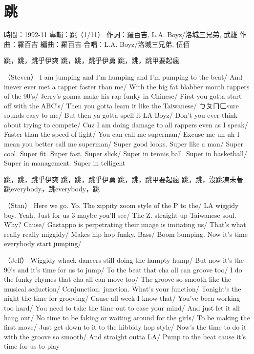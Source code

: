 \documentclass[UTF8,a4paper,oneside,twocolumn,12pt]{ctexbook}
\newcommand{\infopair}[2]{\textbullet #1：#2}
\newcommand{\zc}[1][伍佰]{\infopair{作詞}{#1}}
\newcommand{\zq}[1][伍佰]{\infopair{作曲}{#1}}
\newcommand{\bq}[1][伍佰]{\infopair{編曲}{#1}}
\newcommand{\zj}[1]{\infopair{專輯}{#1}}
\newcommand{\yc}[1]{\infopair{原唱}{#1}}
\newcommand{\sj}[1]{\infopair{時間}{#1}}
\newenvironment{info}{\begin{flushleft}\kaishu
	}
	{\end{flushleft}\normalsize\yahei\par}
\newenvironment{lyric}{
	}
{}
\begin{document}
\section{跳}
\begin{info}%
	\sj{1992-11}%
	\zj{跳（1/11）}
	\zc[羅百吉, L.A. Boyz/洛城三兄弟, 武雄]
	\zq[羅百吉]
	\bq[羅百吉]
	\infopair{合唱}{L.A. Boyz/洛城三兄弟, 伍佰}
\end{info}
\begin{lyric}
	跳，跳，跳乎伊爽
	跳，跳，跳乎伊勇
	跳，跳，跳甲要起瘋

	（Steven）
	I am jumping and I'm humping and I'm pumping to the beat/
	And inever ever met a rapper faster than me/
	With the big fat blabber mouth rappers of the 90's/
	Jerry's gonna make his rap funky in Chinese/
	First you gotta start off with the ABC's/
	Then you gotta learn it like the Taiwanese/
	ㄅㄆㄇㄈsure sounds easy to me/
	But then ya gotta spell it LA Boyz/
	Don't you ever think about trying to compete/
	Cuz I am doing damage to all rappers even as I speak/
	Faster than the speed of light/
	You can call me superman/
	Excuse me uh-uh I mean you better call me superman/
	Super good looks. Super like a man/
	Super cool. Super fit. Super fast. Super slick/
	Super in tennis ball. Super in basketball/
	Super in management. Super in telligent

	跳，跳，跳乎伊爽
	跳，跳，跳乎伊勇
	跳，跳，跳甲要起瘋
	跳，跳，沒跳凍未著
	跳everybody，跳everybody，跳

	（Stan）
	Here we go. Yo. The zippity zoom style of the P to the/
	LA wiggidy boy. Yeah. Just for us 3 maybe you'll see/
	The Z. straight-up Taiwanese soul. Why? Cause/
	Gastappo is perpetrating their image is imitating us/
	That's what really really miggidy/
	Makes hip hop funky. Bass/
	Boom bumping. Now it's time everybody start jumping/

	（Jeff）
	Wiggidy whack dancers still doing the humpty hump/
	But now it's the 90's and it's time for us to jump/
	To the beat that cha all can groove too/
	I do the funky rhymes that cha all can move too/
	The groove so smooth like the musical seduction/
	Conjunction. junction. What's your function/
	Tonight's the night the time for grooving/
	Cause all week I know that/
	You've been working too hard/
	You need to take the time out to ease your mind/
	And just let it all hang out/
	No time to be faking or waiting around for the girls/
	To be making the first move/
	Just get down to it to the hibbidy hop style/
	Now's the time to do it with the groove so smooth/
	And straight outta LA/
	Pump to the beat cause it's time for us to play
\end{lyric}
\end{document}
